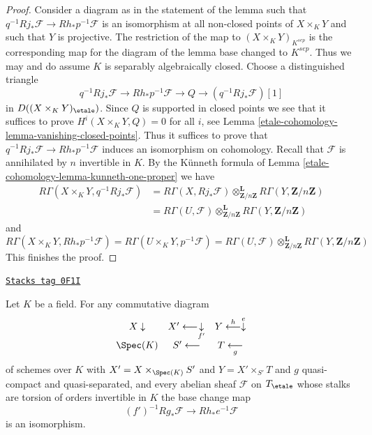 \begin{proof}
\medskip\noindent
Consider a diagram as in the statement of the lemma
such that $q^{-1}Rj_*\mathcal{F} \to Rh_*p^{-1}\mathcal{F}$
is an isomorphism at all non-closed points of $X \times_K Y$
and such that $Y$ is projective.
The restriction of the map to $(X \times_K Y)_{K^{sep}}$
is the corresponding map for the diagram of the lemma
base changed to $K^{sep}$. Thus we may and do assume $K$
is separably algebraically closed. Choose a distinguished triangle
$$
q^{-1}Rj_*\mathcal{F} \to Rh_*p^{-1}\mathcal{F} \to Q \to
(q^{-1}Rj_*\mathcal{F})[1]
$$
in $D((X \times_K Y)_\etale)$. Since $Q$ is supported in
closed points we see that it suffices to prove
$H^i(X \times_K Y, Q) = 0$ for all $i$, see
Lemma \ref{etale-cohomology-lemma-vanishing-closed-points}.
Thus it suffices to prove that
$q^{-1}Rj_*\mathcal{F} \to Rh_*p^{-1}\mathcal{F}$
induces an isomorphism on cohomology. Recall that $\mathcal{F}$
is annihilated by $n$ invertible in $K$.
By the K\"unneth formula of Lemma \ref{etale-cohomology-lemma-kunneth-one-proper}
we have
\begin{align*}
R\Gamma(X \times_K Y, q^{-1}Rj_*\mathcal{F})
&=
R\Gamma(X, Rj_*\mathcal{F})
\otimes_{\mathbf{Z}/n\mathbf{Z}}^\mathbf{L}
R\Gamma(Y, \mathbf{Z}/n\mathbf{Z}) \\
& =
R\Gamma(U, \mathcal{F})
\otimes_{\mathbf{Z}/n\mathbf{Z}}^\mathbf{L}
R\Gamma(Y, \mathbf{Z}/n\mathbf{Z})
\end{align*}
and
$$
R\Gamma(X \times_K Y, Rh_*p^{-1}\mathcal{F}) =
R\Gamma(U \times_K Y, p^{-1}\mathcal{F}) =
R\Gamma(U, \mathcal{F})
\otimes_{\mathbf{Z}/n\mathbf{Z}}^\mathbf{L}
R\Gamma(Y, \mathbf{Z}/n\mathbf{Z})
$$
This finishes the proof.
\end{proof}

\begin{lemma}
\label{etale-cohomology-lemma-punctual-base-change}
\href{https://stacks.math.columbia.edu/tag/0F1I}{\texttt{Stacks tag 0F1I}}

Let $K$ be a field. For any commutative diagram
$$
\begin{array}{ccc}X \downarrow & X' \longleftarrow\underset{f'}{\downarrow} & Y \overset{h}{\longleftarrow}\overset{e}{\downarrow} \\ \Spec(K) & S' \longleftarrow & T \underset{g}{\longleftarrow}\end{array}
$$
of schemes over $K$ with
$X' = X \times_{\Spec(K)} S'$ and $Y = X' \times_{S'} T$ and
$g$ quasi-compact and quasi-separated, and every abelian sheaf
$\mathcal{F}$ on $T_\etale$ whose stalks are torsion of orders
invertible in $K$ the base change map
$$
(f')^{-1}Rg_*\mathcal{F}
\longrightarrow
Rh_*e^{-1}\mathcal{F}
$$
is an isomorphism.
\end{lemma}

